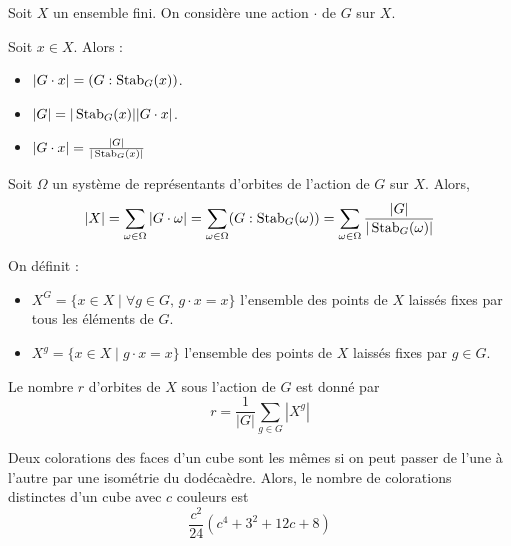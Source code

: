   
  Soit $X$ un ensemble fini. On considère une action $\cdot$ de $G$ sur $X$.
  
  \begin{proposition}
    Soit $x \in X$. Alors :
    \begin{itemize}
      \item $|G \cdot x| = (G : \operatorname{Stab}_G(x))$.
      \item $|G| = |\operatorname{Stab}_G(x)| |G \cdot x|$.
      \item $|G \cdot x| = \frac{|G|}{|\operatorname{Stab}_G(x)|}$
    \end{itemize}
  \end{proposition}
  
  \begin{theorem}
    Soit $\Omega$ un système de représentants d'orbites de l'action de $G$ sur $X$. Alors,
    \[ |X| = \sum_{\omega \in \Omega} |G \cdot \omega| = \sum_{\omega \in \Omega} (G : \operatorname{Stab}_G(\omega)) = \sum_{\omega \in \Omega} \frac{|G|}{|\operatorname{Stab}_G(\omega)|} \]
  \end{theorem}
  
  \begin{definition}
    On définit :
    \begin{itemize}
      \item $X^G = \{ x \in X \mid \forall g \in G, \, g \cdot x = x \}$ l'ensemble des points de $X$ laissés fixes par tous les éléments de $G$.
      \item $X^g = \{ x \in X \mid g \cdot x = x \}$ l'ensemble des points de $X$ laissés fixes par $g \in G$.
    \end{itemize}
  \end{definition}
  
  \begin{theorem}
    Le nombre $r$ d'orbites de $X$ sous l'action de $G$ est donné par
    \[ r = \frac{1}{|G|} \sum_{g \in G} |X^g| \]
  \end{theorem}
  
  
  \begin{application}
    Deux colorations des faces d'un cube sont les mêmes si on peut passer de l'une à l'autre par une isométrie du dodécaèdre. Alors, le nombre de colorations distinctes d'un cube avec $c$ couleurs est
    \[ \frac{c^2}{24} (c^4 + 3^2 + 12c + 8) \]
  \end{application}
  
